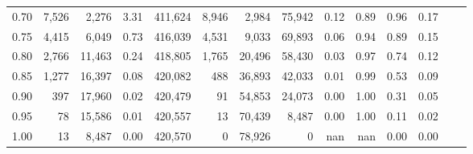 \begin{tabular}{rrrrrrrrrrrrrr}
0.70 &   7,526 &   2,276 &      3.31 &  411,624 &    8,946 &   2,984 &  75,942 &  0.12 &  0.89 &  0.96 &      0.17 \\
0.75 &   4,415 &   6,049 &      0.73 &  416,039 &    4,531 &   9,033 &  69,893 &  0.06 &  0.94 &  0.89 &      0.15 \\
0.80 &   2,766 &  11,463 &      0.24 &  418,805 &    1,765 &  20,496 &  58,430 &  0.03 &  0.97 &  0.74 &      0.12 \\
0.85 &   1,277 &  16,397 &      0.08 &  420,082 &      488 &  36,893 &  42,033 &  0.01 &  0.99 &  0.53 &      0.09 \\
0.90 &     397 &  17,960 &      0.02 &  420,479 &       91 &  54,853 &  24,073 &  0.00 &  1.00 &  0.31 &      0.05 \\
0.95 &      78 &  15,586 &      0.01 &  420,557 &       13 &  70,439 &   8,487 &  0.00 &  1.00 &  0.11 &      0.02 \\
1.00 &      13 &   8,487 &      0.00 &  420,570 &        0 &  78,926 &       0 &   nan &   nan &  0.00 &      0.00 \\
\bottomrule
\end{tabular}
